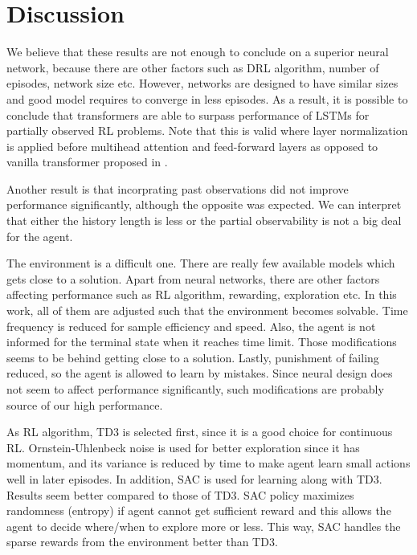 \section{Discussion}
We believe that these results are not enough to conclude on a superior neural network, because there are other factors such as DRL algorithm, number of episodes, network size etc. 
However, networks are designed to have similar sizes and good model requires to converge in less episodes. 
As a result, it is possible to conclude that transformers are able to surpass performance of LSTMs for partially observed RL problems. 
Note that this is valid where layer normalization is applied before multihead attention and feed-forward layers \cite{xiong_layer_2020} as opposed to vanilla transformer proposed in \cite{vaswani_attention_2017}. 

Another result is that incorprating past observations did not improve performance significantly, although the opposite was expected. 
We can interpret that either the history length is less or the partial observability is not a big deal for the agent. 

The environment is a difficult one. 
There are really few available models which gets close to a solution. 
Apart from neural networks, there are other factors affecting performance such as RL algorithm, rewarding, exploration etc. 
In this work, all of them are adjusted such that the environment becomes solvable. 
Time frequency is reduced for sample efficiency and speed. 
Also, the agent is not informed for the terminal state when it reaches time limit. 
Those modifications seems to be behind getting close to a solution. 
Lastly, punishment of failing reduced, so the agent is allowed to learn by mistakes. 
Since neural design does not seem to affect performance significantly, such modifications are probably source of our high performance.

As RL algorithm, TD3 is selected first, since it is a good choice for continuous RL. 
Ornstein-Uhlenbeck noise is used for better exploration since it has momentum, and its variance is reduced by time to make agent learn small actions well in later episodes. 
In addition, SAC is used for learning along with TD3. Results seem better compared to those of TD3. 
SAC policy maximizes randomness (entropy) if agent cannot get sufficient reward and this allows the agent to decide where/when to explore more or less. 
This way, SAC handles the sparse rewards from the environment better than TD3. 

